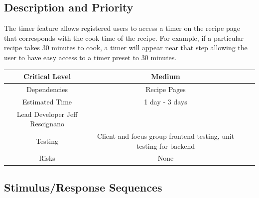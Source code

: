 \documentclass{scrreprt}
\begin{document}
\subsection{Description and Priority}

The timer feature allows registered users to access a timer on the recipe page that corresponds with the cook time of the recipe. For example, if a particular recipe takes 30 minutes to cook, a timer will appear near that step allowing the user to have easy access to a timer preset to 30 minutes.

\begin{center}
    \begin{tabular}{| c | c | c | c |}
        \hline
        Critical Level & Medium                                                            \\
        \hline
        Dependencies   & Recipe Pages                                                      \\
        \hline
        Estimated Time & 1 day - 3 days                                                    \\
        \hline
        Lead Developer Jeff Rescignano                                                \\
        \hline
        Testing         & Client and focus group \gls{frontend} testing,
                          \gls{unit testing} for \gls{backend}                             \\
        \hline
        Risks          & None                                                              \\
        \hline
    \end{tabular}
\end{center}

\subsection{Stimulus/Response Sequences}
\end{document}
